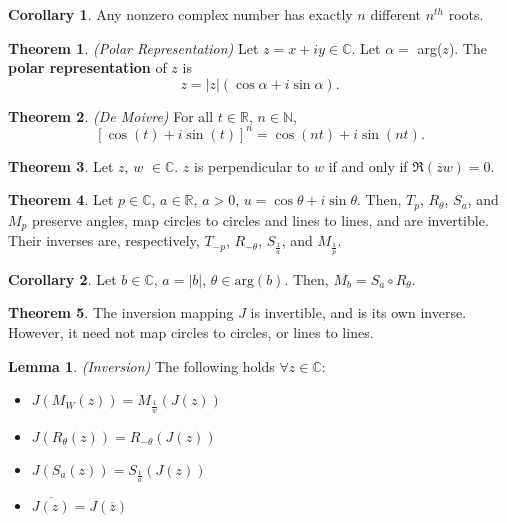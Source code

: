 \documentclass[a4paper]{article}
\theoremstyle{definition}
\newtheorem{theorem}{Theorem}
\newtheorem{lemma}{Lemma}
\newtheorem{corollary}{Corollary}
\begin{document}
	\begin{corollary}
		Any nonzero complex number has exactly $n$ different $n^{th}$ roots.
	\end{corollary}
	
	\begin{theorem}
		\emph{(Polar Representation)}
		Let $z = x + iy \in \mathbb{C}$. Let $\alpha = $ arg($z$). The \textbf{polar representation} of $z$ is
		$$z = |z|(\cos{\alpha} + i \sin{\alpha}).$$
	\end{theorem}
	
	\begin{theorem}
		\emph{(De Moivre)}
		For all $t \in \mathbb{R}$, $n \in \mathbb{N}$,
		$$[\cos{(t)} + i \sin{(t)}]^{n} = \cos{(nt)} + i \sin{(nt)}.$$
	\end{theorem}
	
	\begin{theorem}
		Let $z$, $w$ $\in \mathbb{C}$. $z$ is perpendicular to $w$ if and only if $\Re(\overline{z}w) = 0$.
	\end{theorem}
	
	\begin{theorem}
		Let $p \in \mathbb{C}$, $a \in \mathbb{R}$, $a > 0$, $u = \cos{\theta} + i \sin{\theta}$. Then, $T_{p}$, $R_{\theta}$, $S_{a}$, and $M_{p}$ preserve angles, map circles to circles and lines to lines, and are invertible. Their inverses are, respectively, $T_{-p}$, $R_{-\theta}$, $S_{\frac{1}{a}}$, and $M_{\frac{1}{p}}$. 
	\end{theorem}
	
	\begin{corollary}
		Let $b \in \mathbb{C}$, $a = |b|$, $\theta \in \text{arg}(b)$. Then, $M_{b} = S_{a} \circ R_{\theta}$.
	\end{corollary}
	
	\begin{theorem}
		The inversion mapping $J$ is invertible, and is its own inverse. However, it need not map circles to circles, or lines to lines.
	\end{theorem}
	
	\begin{lemma}
		\emph{(Inversion)}
		The following holds $\forall z \in \mathbb{C}$:
		\begin{itemize}
			\item $J(M_{W}(z)) = M_{\frac{1}{w}}(J(z))$
			\item $J(R_{\theta}(z)) = R_{-\theta}(J(z))$
			\item $J(S_{a}(z)) = S_{\frac{1}{a}}(J(z))$
			\item $\overline{J(z)} = J(\overline{z})$
		\end{itemize}
	\end{lemma}
	
\end{document}

